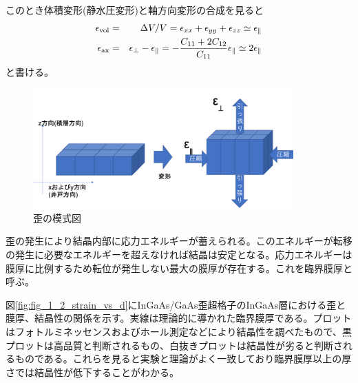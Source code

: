 このとき体積変形(静水圧変形)と軸方向変形の合成を見ると
\begin{eqnarray}
\epsilon_{\rm{vol}}&=&\Delta V/V=\epsilon _{xx}+\epsilon _{yy}+\epsilon_{zz}\simeq \epsilon_{\|}\\
\epsilon_{\rm{ax}}&=&\epsilon_{\bot}-\epsilon_{\|}=-\dfrac{C_{11}+2C_{12}}{C_{11}}\epsilon_{\|}\simeq 2\epsilon_{\|}
\end{eqnarray}
と書ける。
\begin{figure}[h]
	\centering
	\includegraphics[width=10cm]{figure/fig_1_1_lattice_strain02.png}
	\caption{歪の模式図}
	\label{fig:fig_lattice_strain02}
\end{figure}
歪の発生により結晶内部に応力エネルギーが蓄えられる。このエネルギーが転移の発生に必要なエネルギーを超えなければ結晶は安定となる。応力エネルギーは膜厚に比例するため転位が発生しない最大の膜厚が存在する。これを臨界膜厚と呼ぶ。

図\ref{fig:fig_1_2_strain_vs_d}にInGaAs/GaAs歪超格子のInGaAs層における歪と膜厚、結晶性の関係を示す\cite{ref_konagai}。実線は理論的に導かれた臨界膜厚である。プロットはフォトルミネッセンスおよびホール測定などにより結晶性を調べたもので、黒プロットは高品質と判断されるもの、白抜きプロットは結晶性が劣ると判断されるものである。これらを見ると実験と理論がよく一致しており臨界膜厚以上の厚さでは結晶性が低下することがわかる。

